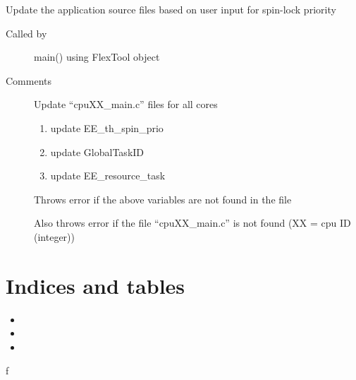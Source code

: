 \documentclass[letterpaper,10pt,english]{sphinxmanual}
\begin{document}
\begin{fulllineitems}
\begin{fulllineitems}
\end{fulllineitems}


\begin{fulllineitems}
\label{\detokenize{code:FlexTool.FlexTool.updateSourceFiles}}
Update the application source files based on user input for spin-lock priority
\begin{description}
\item[{Called by}] \leavevmode{[}{]}
main() using FlexTool object

\item[{Comments}] \leavevmode{[}{]}
Update “cpuXX\_main.c” files for all cores
\begin{enumerate}
\item {} 
update EE\_th\_spin\_prio

\item {} 
update GlobalTaskID

\item {} 
update EE\_resource\_task

\end{enumerate}

Throws error if the above variables are not found in the file

Also throws error if the file “cpuXX\_main.c” is not found (XX = cpu ID (integer))

\end{description}

\end{fulllineitems}


\end{fulllineitems}



\chapter{Indices and tables}
\label{\detokenize{index:indices-and-tables}}\begin{itemize}
\item {} 

\item {} 

\item {} 

\end{itemize}


\renewcommand{\indexname}{Python Module Index}
\begin{sphinxtheindex}
\def\bigletter#1{{\Large\sffamily#1}\nopagebreak\vspace{1mm}}
\bigletter{f}
\item {}
\end{sphinxtheindex}

\renewcommand{\indexname}{Index}
\printindex
\end{document}
